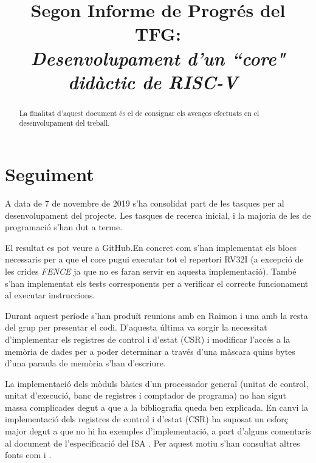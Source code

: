 \documentclass[conference,onecolumn, catalan]{IEEEtran}
\title{Segon Informe de Progrés del TFG: \\ \vspace{0.2cm} {\huge \textit{ Desenvolupament d'un ``core" didàctic de RISC-V\ }} }
\author{
\IEEEauthorblockN{Pau Casacuberta Orta}
\IEEEauthorblockA{
\textit{Autonomous University of Barcelona}\\
Cerdanyola del Vallès, Barcelona 08193\\
pau.casacubertao@e-campus.uab.cat\\}}
\begin{document}
\maketitle

\begin{versionhistory}
\end{versionhistory}


\begin{abstract}
La finalitat d'aquest document és el de consignar els avenços efectuats en el desenvolupament del treball.
\end{abstract}

\section{Seguiment}

A data de 7 de novembre de 2019 s'ha consolidat part de les tasques per al desenvolupament del projecte. 
Les tasques de recerca inicial, i la majoria de les de programació s'han dut a terme. 

El resultat es pot veure a GitHub\cite{casacuberta_orta_4a1c0/rv32i-verilog_2019}.En concret com s'han implementat els blocs necessaris per a que el core pugui executar tot el repertori RV32I (a excepció de les crides \textit{FENCE} ja que no es faran servir en aquesta implementació). 
També s'han implementat els tests corresponents per a verificar el correcte funcionament al executar instruccions.

Durant aquest període s'han produït reunions amb en Raimon i una amb la resta del grup per presentar el codi. D'aquesta última va sorgir la necessitat d'implementar els registres de control i d'estat (CSR) i modificar l'accés a la memòria de dades per a poder determinar a través d'una màscara quins bytes d'una paraula de memòria s'han d'escriure.

La implementació dels mòduls bàsics d'un processador general (unitat de control, unitat d'execució, banc de registres i comptador de programa) no han sigut massa complicades degut a que a la bibliografia \cite{patterson_computer_2018} queda ben explicada. En canvi la implementació dels registres de control i d'estat (CSR) ha suposat un esforç major degut a que no hi ha exemples d'implementació, a part d'alguns comentaris al document de l'especificació del ISA \cite{waterman_volume_2019}. Per aquest motiu s'han consultat altres fonts com \cite{noauthor_fe310g:_2017} i \cite{noauthor_control_nodate}.
\end{document}
